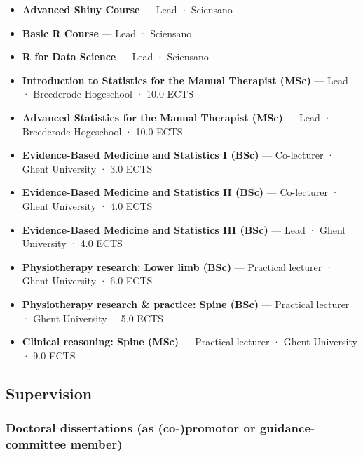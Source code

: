 \documentclass[
  letterpaper,
  DIV=11,
  numbers=noendperiod]{scrartcl}
\providecommand{\tightlist}{%
  \setlength{\itemsep}{0pt}\setlength{\parskip}{0pt}}\usepackage{longtable,booktabs,array}
\begin{document}
\begin{itemize}
\tightlist
\item
  \textbf{Advanced Shiny Course} --- Lead · Sciensano
\item
  \textbf{Basic R Course} --- Lead · Sciensano
\item
  \textbf{R for Data Science} --- Lead · Sciensano
\item
  \textbf{Introduction to Statistics for the Manual Therapist (MSc)} ---
  Lead · Breederode Hogeschool · 10.0 ECTS
\item
  \textbf{Advanced Statistics for the Manual Therapist (MSc)} --- Lead ·
  Breederode Hogeschool · 10.0 ECTS
\item
  \textbf{Evidence-Based Medicine and Statistics I (BSc)} ---
  Co-lecturer · Ghent University · 3.0 ECTS
\item
  \textbf{Evidence-Based Medicine and Statistics II (BSc)} ---
  Co-lecturer · Ghent University · 4.0 ECTS
\item
  \textbf{Evidence-Based Medicine and Statistics III (BSc)} --- Lead ·
  Ghent University · 4.0 ECTS
\item
  \textbf{Physiotherapy research: Lower limb (BSc)} --- Practical
  lecturer · Ghent University · 6.0 ECTS
\item
  \textbf{Physiotherapy research \& practice: Spine (BSc)} --- Practical
  lecturer · Ghent University · 5.0 ECTS
\item
  \textbf{Clinical reasoning: Spine (MSc)} --- Practical lecturer ·
  Ghent University · 9.0 ECTS
\end{itemize}

\subsection{Supervision}\label{supervision}

\subsubsection{Doctoral dissertations (as (co-)promotor or
guidance-committee
member)}\label{doctoral-dissertations-as-co-promotor-or-guidance-committee-member}
\end{document}
